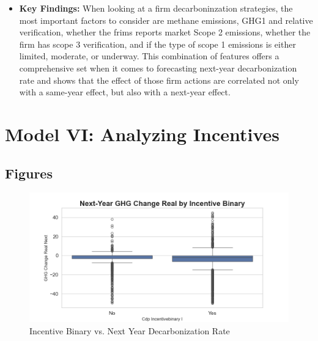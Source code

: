\begin{itemize}
    \item \textbf{Key Findings:} When looking at a firm decarboninzation strategies, the most important factors to consider are methane emissions, GHG1 and relative verification, whether the frims reports market Scope 2 emissions, whether the firm has scope 3 verification, and if the type of scope 1 emissions is either limited, moderate, or underway. This combination of features offers a comprehensive set when it comes to forecasting next-year decarbonization rate and shows that the effect of those firm actions are correlated not only with a same-year effect, but also with a next-year effect.
    
    
\end{itemize}


\section{Model VI: Analyzing Incentives}



\subsection{Figures}
\begin{figure}[H]
\centering
    \includegraphics[width=\textwidth]{figures/ghg_change_real_next_by_cdp_incentivebinary_i.png}
\caption{Incentive Binary vs. Next Year Decarbonization Rate}
\label{fig:ghg_change_real_next_by_cdp_incentivebinary_i}
\end{figure}

